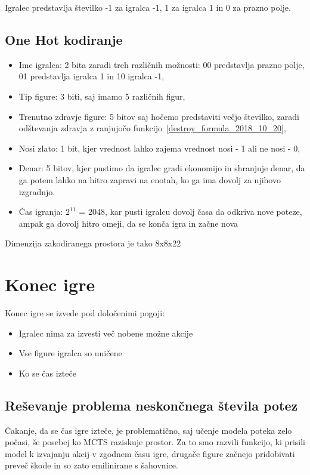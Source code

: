 \documentclass[a4paper, 12pt]{book}
\begin{document}
Igralec predstavlja številko -1 za igralca -1, 1 za igralca 1 in 0 za prazno polje.
\subsection{One Hot kodiranje}
\begin{itemize}
	\item Ime igralca: 2 bita zaradi treh različnih možnosti: 00 predstavlja prazno polje, 01 predstavlja igralca 1 in 10 igralca -1,
	\item Tip figure: 3 biti, saj imamo 5 različnih figur,
	\item Trenutno zdravje figure: 5 bitov saj hočemo predstaviti večjo številko, zaradi odštevanja zdravja z ranjujočo funkcijo~\ref{destroy_formula_2018_10_20},
	\item Nosi zlato: 1 bit, kjer vrednost lahko zajema vrednost nosi - 1 ali ne nosi - 0,
	\item Denar: 5 bitov, kjer pustimo da igralec gradi ekonomijo in shranjuje denar, da ga potem lahko na hitro zapravi na enotah, ko ga ima dovolj za njihovo izgradnjo.
	\item Čas igranja: $2^{11}$ = 2048, kar pusti igralcu dovolj časa da odkriva nove poteze, ampak ga dovolj hitro omeji, da se konča igra in začne nova
\end{itemize}
Dimenzija zakodiranega prostora je tako 8x8x22

\section{Konec igre}

Konec igre se izvede pod določenimi pogoji:
\begin{itemize}
	\item Igralec nima za izvesti več nobene možne akcije
	\item Vse figure igralca so uničene
	\item Ko se čas izteče
\end{itemize}


\subsection{Reševanje problema neskončnega števila potez}
Čakanje, da se čas igre izteče, je problematično, saj učenje modela poteka zelo počasi, še posebej ko MCTS raziskuje prostor.
Za to smo razvili funkcijo, ki prisili model k izvajanju akcij v zgodnem času igre, drugače figure začnejo pridobivati preveč škode in so zato emilinirane s šahovnice.
\end{document}
